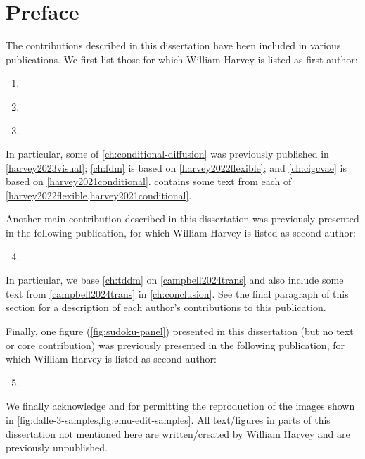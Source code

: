 
\chapter{Preface}

The contributions described in this dissertation have been included in various publications. We first list those for which William Harvey is listed as first author:
\begin{enumerate}
    \item {} \label{harvey2023visual}
    \item {} \label{harvey2022flexible}
    \item {} \label{harvey2021conditional}
\end{enumerate}
In particular, some of \cref{ch:conditional-diffusion} was previously published in \cref{harvey2023visual}; \cref{ch:fdm} is based on \cref{harvey2022flexible}; and \cref{ch:cigcvae} is based on \cref{harvey2021conditional}.  contains some text from each of \cref{harvey2022flexible,harvey2021conditional}.

Another main contribution described in this dissertation was previously presented in the following publication, for which William Harvey is listed as second author:
\begin{enumerate}
    \setcounter{enumi}{3}
    \item {} \label{campbell2024trans}
\end{enumerate}
In particular, we base \cref{ch:tddm} on \cref{campbell2024trans} and also include some text from \cref{campbell2024trans} in \cref{ch:conclusion}. See the final paragraph of this section for a description of each author's contributions to this publication.

Finally, one figure (\cref{fig:sudoku-panel}) presented in this dissertation (but no text or core contribution) was previously presented in the following publication, for which William Harvey is listed as second author:
\begin{enumerate}
    \setcounter{enumi}{4}
    \item {} \label{weilbach2023graphically}
\end{enumerate}
We finally acknowledge \citeauthor{sheynin2023emu} and \citeauthor{betker2023improving} for permitting the reproduction of the images shown in \cref{fig:dalle-3-samples,fig:emu-edit-samples}. All text/figures in parts of this dissertation not mentioned here are written/created by William Harvey and are previously unpublished.

